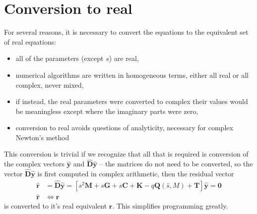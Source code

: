 \documentclass[10pt,openany,twoside]{book}
\numberwithin{equation}{section}   %
\newcommand{\Matrix}[1]{\boldsymbol{#1}}
\newcommand{\Vector}[1]{\boldsymbol{#1}}
\newcommand{\Sectref}[1]{\S\ref{#1}}
\newcommand{\Eqna}[2]{Eqs. \ref{#1} and \ref{#2}}
\begin{document}

\section{Conversion to real}\label{sect:real-conversion}
For several reasons, it is necessary to convert the equations to the
equivalent set of real equations:
\begin{itemize}
	\item all of the parameters (except $s$) are real,
	\item numerical algorithms are written in homogeneous terms,
		either all real or all complex, never mixed,
	\item if instead, the real parameters were converted to complex
		their values would be meaningless except where the imaginary parts
		were zero,
	\item conversion to real avoids questions of analyticity, necessary
		for complex Newton's method
\end{itemize}
This conversion is trivial if we recognize that all that is required
is conversion of the complex vectors $\Vector{\hat{y}}$ and $\Vector{\hat{D}\hat{y}}$
-- the matrices do not need to be converted, so the vector $\Vector{\hat{D}\hat{y}}$
is first computed in complex arithmetic, then the residual vector
\begin{align}\label{eqn:residual}
	\hat{\Vector{r}} &= \Vector{\hat{D}\hat{y}}
		= \left[ s^2 \Matrix{M} + s \Matrix{G} + s \Matrix{C} +
			 \Matrix{K} - q \Matrix{Q} (\bar{s},M)
			 + \Matrix{T} \right] \hat{\Vector{y}} = \Vector{0} \nonumber \\
	\hat{\Vector{r}} &\Leftrightarrow \Vector{r}
\end{align}
is converted to it's real equivalent $\Vector{r}$. This simplifies programming greatly.
\end{document}
